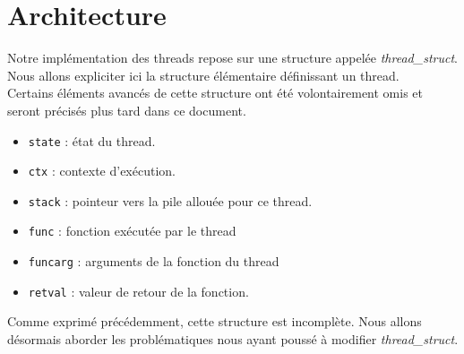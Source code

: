 \section{Architecture}
Notre implémentation des threads repose sur une structure appelée \textit{thread\_struct}. Nous allons expliciter ici la structure élémentaire définissant un thread.\\ 
Certains éléments avancés de cette structure ont été volontairement omis et seront précisés plus tard dans ce document.

\begin{itemize}
    \item \texttt{state} : état du thread.
    \item \texttt{ctx} : contexte d’exécution.
    \item \texttt{stack} : pointeur vers la pile allouée pour ce thread.
    \item \texttt{func} : fonction exécutée par le thread
    \item \texttt{funcarg} : arguments de la fonction du thread
    \item \texttt{retval} : valeur de retour de la fonction.
\end{itemize}

Comme exprimé précédemment, cette structure est incomplète. Nous allons désormais aborder les problématiques nous ayant poussé à modifier \textit{thread\_struct}.






